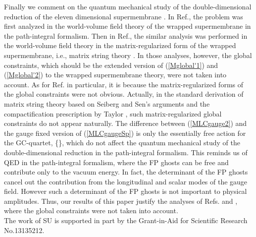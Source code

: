 \documentclass[12pt,a4paper]{article}
\begin{document}
Finally we comment on the quantum mechanical study of the
double-dimensional reduction of the eleven dimensional supermembrane
\cite{SY,UY}.
In Ref.\cite{SY}, the problem was first analyzed in the world-volume
field theory of the wrapped supermembrane in the path-integral formalism.
Then in Ref.\cite{UY}, the similar analysis was performed in the
world-volume field theory in the matrix-regularized form of the
wrapped supermembrane, i.e., matrix string theory \cite{Mot,DVV}.
In those analyses, however, the global constraints, which should
be the extended version of (\ref{Mglobal'1}) and (\ref{Mglobal'2})
to the wrapped supermembrane theory, were not taken into account.
As for Ref.\cite{UY} in particular, it is because the
matrix-regularized forms of the global constraints were not obvious.
Actually, in the standard derivation \cite{Mot,DVV} of matrix string
theory based on Seiberg and Sen's arguments \cite{Sei,Sen} and the
compactification prescription by Taylor \cite{Tay}, such
matrix-regularized global constraints do not appear naturally.
The difference between \coordHE{} (\ref{MLCgauge2}) and the gauge
fixed version of \coordHE{} (\ref{MLCgaugeSp}) is only the essentially
free action for the GC-quartet, \{\coordHE{}\}, which do not affect the quantum mechanical study of
the double-dimensional reduction in the path-integral formalism.
This reminds us of QED in the path-integral formalism, where
the FP ghosts can be free and contribute only to the vacuum energy.
In fact, the determinant of the FP ghosts cancel out the contribution
from the longitudinal and scalar modes of the gauge field.
However such a determinant of the FP ghosts is not important to
physical amplitudes.
Thus, our results of this paper justify the analyses of Refs.\cite{SY}
and \cite{UY}, where the global constraints were not taken into
account.\\[\baselineskip]
The work of SU is supported in part by the Grant-in-Aid for Scientific
Research No.13135212.
\end{document}
